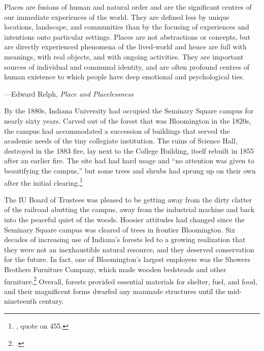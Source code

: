 \documentclass[
  american,
  letterpaper,
]{scrreprt}
\begin{document}
\epigraph{
Places are fusions of human and natural order and are the significant centres of our immediate experiences of the world. They are defined less by unique locations, landscape, and communities than by the focusing of experiences and intentions onto particular settings. Places are not abstractions or concepts, but are directly experienced phenomena of the lived-world and hence are full with meanings, with real objects, and with ongoing activities. They are important sources of individual and communal identity, and are often profound centres of human existence to which people have deep emotional and psychological ties. 
}
{---Edward Relph, \textit{Place and Placelessness}}

By the 1880s, Indiana University had occupied the Seminary Square campus
for nearly sixty years. Carved out of the forest that was Bloomington in
the 1820s, the campus had accommodated a succession of buildings that
served the academic needs of the tiny collegiate institution. The ruins
of Science Hall, destroyed in the 1883 fire, lay next to the College
Building, itself rebuilt in 1855 after an earlier fire. The site had had
hard usage and ``no attention was given to beautifying the campus,'' but
some trees and shrubs had sprung up on their own after the initial
clearing.\footnote{, quote on 455.}

The IU Board of Trustees was pleased to be getting away from the dirty
clatter of the railroad abutting the campus, away from the industrial
machine and back into the peaceful quiet of the woods. Hoosier attitudes
had changed since the Seminary Square campus was cleared of trees in
frontier Bloomington. Six decades of increasing use of Indiana's forests
led to a growing realization that they were not an inexhaustible natural
resource, and they deserved conservation for the future. In fact, one of
Bloomington's largest employers was the Showers Brothers Furniture
Company, which made wooden bedsteads and other furniture.\footnote{.} Overall, forests provided essential
materials for shelter, fuel, and food, and their magnificent forms
dwarfed any manmade structures until the mid-nineteenth century.
\end{document}
